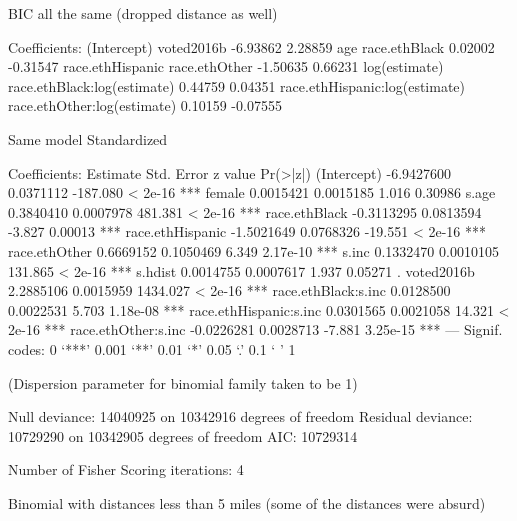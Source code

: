 BIC all the same (dropped distance as well)

Coefficients:
                   (Intercept)                      voted2016b
                      -6.93862                         2.28859
                           age                   race.ethBlack
                       0.02002                        -0.31547
              race.ethHispanic                   race.ethOther
                      -1.50635                         0.66231
                 log(estimate)     race.ethBlack:log(estimate)
                       0.44759                         0.04351
race.ethHispanic:log(estimate)     race.ethOther:log(estimate)
                       0.10159                        -0.07555



Same model Standardized


Coefficients:
                         Estimate Std. Error  z value Pr(>|z|)
(Intercept)            -6.9427600  0.0371112 -187.080  < 2e-16 ***
female                  0.0015421  0.0015185    1.016  0.30986
s.age                   0.3840410  0.0007978  481.381  < 2e-16 ***
race.ethBlack          -0.3113295  0.0813594   -3.827  0.00013 ***
race.ethHispanic       -1.5021649  0.0768326  -19.551  < 2e-16 ***
race.ethOther           0.6669152  0.1050469    6.349 2.17e-10 ***
s.inc                   0.1332470  0.0010105  131.865  < 2e-16 ***
s.hdist                 0.0014755  0.0007617    1.937  0.05271 .
voted2016b              2.2885106  0.0015959 1434.027  < 2e-16 ***
race.ethBlack:s.inc     0.0128500  0.0022531    5.703 1.18e-08 ***
race.ethHispanic:s.inc  0.0301565  0.0021058   14.321  < 2e-16 ***
race.ethOther:s.inc    -0.0226281  0.0028713   -7.881 3.25e-15 ***
---
Signif. codes:  0 ‘***’ 0.001 ‘**’ 0.01 ‘*’ 0.05 ‘.’ 0.1 ‘ ’ 1

(Dispersion parameter for binomial family taken to be 1)

    Null deviance: 14040925  on 10342916  degrees of freedom
Residual deviance: 10729290  on 10342905  degrees of freedom
AIC: 10729314

Number of Fisher Scoring iterations: 4


Binomial with distances less than 5 miles (some of the distances were absurd)

